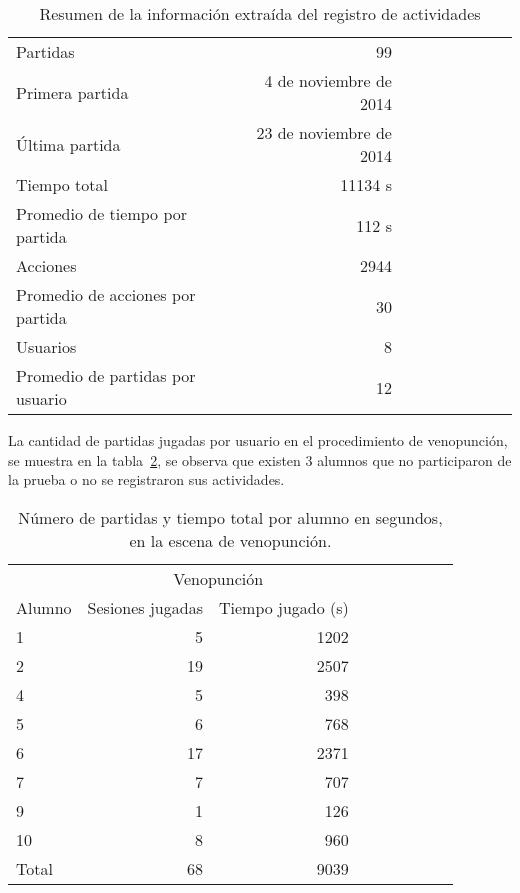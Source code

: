 \begin{table}[H]
\centering
\begin{tabular}{lrrrrrrrr}
\toprule
Partidas                         & 99 \\
Primera partida					 & 4 de noviembre de 2014 \\
Última partida					 & 23 de noviembre de 2014 \\
\midrule
Tiempo total                     & 11134 s \\
Promedio de tiempo por partida   & 112 s \\
\midrule
Acciones                         & 2944 \\
Promedio de acciones por partida & 30 \\
\midrule
Usuarios                         & 8 \\
Promedio de partidas por usuario & 12 \\
\bottomrule
\end{tabular}
\caption{Resumen de la información extraída del registro de actividades}
\label{tab:log_total}
\end{table}

La cantidad de partidas jugadas por usuario en el procedimiento de venopunción, se muestra en la
tabla~\ref{tab:log_hemocultivo_partida}, se observa que existen $3$ alumnos que no
participaron de la prueba o no se registraron sus actividades.

\begin{table}[H]
\centering
\begin{tabular}{lrrrrrrrr}
\toprule
& \multicolumn{2}{c}{Venopunción} \\
\cmidrule(lr){2-3} 
Alumno   & Sesiones jugadas & Tiempo jugado (s) \\
\midrule
 1       & 5                & 1202 \\
 2       & 19               & 2507 \\
 4       & 5                & 398  \\
 5       & 6                & 768  \\
 6       & 17               & 2371 \\
 7       & 7                & 707  \\
 9       & 1                & 126  \\
10       & 8                & 960  \\
\midrule
Total   & 68               & 9039 \\
\bottomrule
\end{tabular}
\caption{Número de partidas y tiempo total por alumno en segundos, en la escena
    de venopunción.}
\label{tab:log_hemocultivo_partida}
\end{table}



